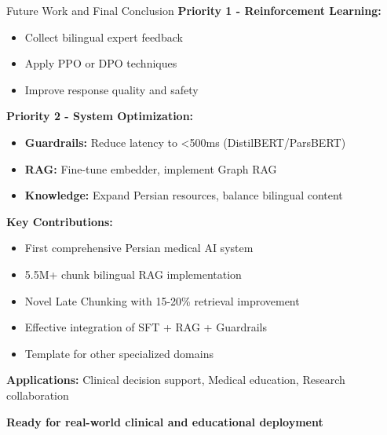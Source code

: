 \begin{frame}{Future Work and Final Conclusion}
    \textbf{Priority 1 - Reinforcement Learning:}
    \begin{itemize}
        \item Collect bilingual expert feedback
        \item Apply PPO or DPO techniques
        \item Improve response quality and safety
    \end{itemize}
    
    \textbf{Priority 2 - System Optimization:}
    \begin{itemize}
        \item \textbf{Guardrails:} Reduce latency to <500ms (DistilBERT/ParsBERT)
        \item \textbf{RAG:} Fine-tune embedder, implement Graph RAG
        \item \textbf{Knowledge:} Expand Persian resources, balance bilingual content
    \end{itemize}
    
    \vspace{0.5em}
    
    \textbf{Key Contributions:}
    \begin{itemize}
        \item \checkmark First comprehensive Persian medical AI system
        \item \checkmark 5.5M+ chunk bilingual RAG implementation
        \item \checkmark Novel Late Chunking with 15-20\% retrieval improvement
        \item \checkmark Effective integration of SFT + RAG + Guardrails
        \item \checkmark Template for other specialized domains
    \end{itemize}
    
    \vspace{0.5em}
    
    \textbf{Applications:} Clinical decision support, Medical education, Research collaboration
    
    \begin{center}
        \colorbox{highlight!20}{\textbf{Ready for real-world clinical and educational deployment}}
    \end{center}
\end{frame}
